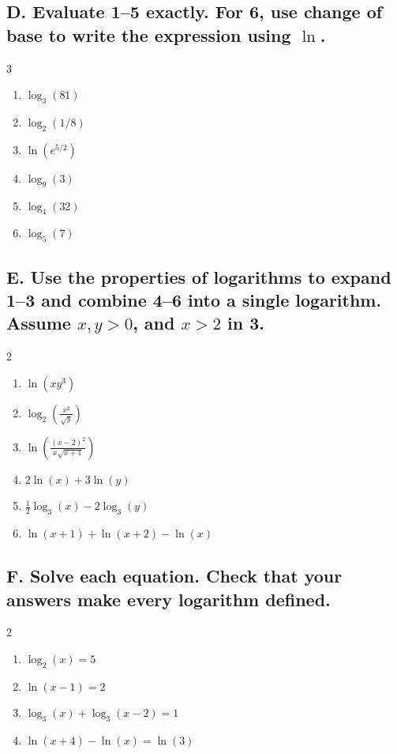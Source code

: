 \documentclass{article}
\begin{document}
\subsection*{D. Evaluate 1--5 exactly. For 6, use change of base to write the expression using $\ln$.}
\begin{multicols}{3}
\begin{enumerate}
    \item $\log_3(81)$
    \item $\log_2(1/8)$
    \item $\ln(e^{5/2})$
    \item $\log_9(3)$
    \item $\log_4(32)$
    \item $\log_5(7)$
\end{enumerate}
\end{multicols}

\subsection*{E. Use the properties of logarithms to expand 1--3 and combine 4--6 into a single logarithm. Assume $x,y>0$, and $x>2$ in 3.}
\begin{multicols}{2}
\begin{enumerate}
    \item $\ln(xy^3)$
    \item $\log_2\left(\frac{x^2}{\sqrt y}\right)$
    \item $\ln\left(\frac{(x-2)^2}{x\sqrt{x+1}}\right)$
    \item $2\ln(x)+3\ln(y)$
    \item $\frac12\log_3(x)-2\log_3(y)$
    \item $\ln(x+1)+\ln(x+2)-\ln(x)$
\end{enumerate}
\end{multicols}

\subsection*{F. Solve each equation. Check that your answers make every logarithm defined.}
\begin{multicols}{2}
\begin{enumerate}
    \item $\log_2(x)=5$
    \item $\ln(x-1)=2$
    \item $\log_3(x)+\log_3(x-2)=1$
    \item $\ln(x+4)-\ln(x)=\ln(3)$
\end{enumerate}
\end{multicols}
\end{document}
